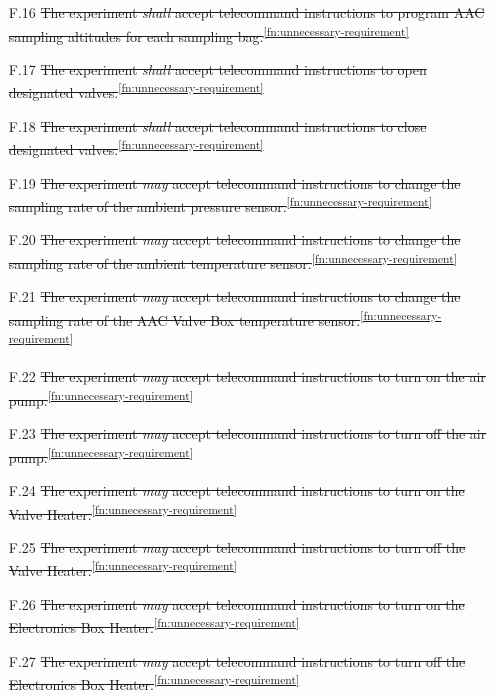 \documentclass[a4paper,12pt,oneside]{article} %
\begin{document}
\begin{appendices}
\begin{enumerate}
    \item[F.16] \st{The experiment \textit{shall} accept telecommand instructions to program AAC sampling altitudes for each sampling bag.}\textsuperscript{\ref{fn:unnecessary-requirement}}
    \item[F.17] \st{The experiment \textit{shall} accept telecommand instructions to open designated valves.}\textsuperscript{\ref{fn:unnecessary-requirement}}
    \item[F.18] \st{The experiment \textit{shall} accept telecommand instructions to close designated valves.}\textsuperscript{\ref{fn:unnecessary-requirement}}
    \item[F.19] \st{The experiment \textit{may} accept telecommand instructions to change the sampling rate of the ambient pressure sensor.}\textsuperscript{\ref{fn:unnecessary-requirement}}
    \item[F.20] \st{The experiment \textit{may} accept telecommand instructions to change the sampling rate of the ambient temperature sensor.}\textsuperscript{\ref{fn:unnecessary-requirement}}
    \item[F.21] \st{The experiment \textit{may} accept telecommand instructions to change the sampling rate of the AAC Valve Box temperature sensor.}\textsuperscript{\ref{fn:unnecessary-requirement}}
    \item[F.22] \st{The experiment \textit{may} accept telecommand instructions to turn on the air pump.}\textsuperscript{\ref{fn:unnecessary-requirement}}
    \item[F.23] \st{The experiment \textit{may} accept telecommand instructions to turn off the air pump.}\textsuperscript{\ref{fn:unnecessary-requirement}}
    \item[F.24] \st{The experiment \textit{may} accept telecommand instructions to turn on the Valve Heater.}\textsuperscript{\ref{fn:unnecessary-requirement}}
    \item[F.25] \st{The experiment \textit{may} accept telecommand instructions to turn off the Valve Heater.}\textsuperscript{\ref{fn:unnecessary-requirement}}
    \item[F.26] \st{The experiment \textit{may} accept telecommand instructions to turn on the Electronics Box Heater.}\textsuperscript{\ref{fn:unnecessary-requirement}}
    \item[F.27] \st{The experiment \textit{may} accept telecommand instructions to turn off the Electronics Box Heater.}\textsuperscript{\ref{fn:unnecessary-requirement}}
\end{enumerate}


\end{appendices}
\end{document}
